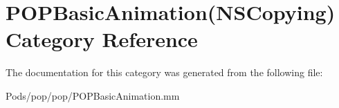 \hypertarget{category_p_o_p_basic_animation_07_n_s_copying_08}{}\section{P\+O\+P\+Basic\+Animation(N\+S\+Copying) Category Reference}
\label{category_p_o_p_basic_animation_07_n_s_copying_08}


The documentation for this category was generated from the following file\+:\begin{DoxyCompactItemize}
\item 
Pods/pop/pop/P\+O\+P\+Basic\+Animation.\+mm\end{DoxyCompactItemize}
